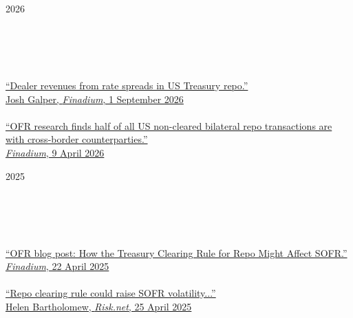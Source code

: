 \documentclass[11pt,letterpaper]{article}
\begin{document}
\noindent
\begin{minipage}[ht]{0.15\textwidth}
2026 \\
\\
\\
\\
\\
\end{minipage}
\begin{minipage}[ht]{0.80\textwidth}
\href{https://finadium.com/dealer-revenues-from-rate-spreads-in-us-treasury-repo/}{``Dealer revenues from rate spreads in US Treasury repo.'' \\
Josh Galper, \textit{Finadium}, 1 September 2026} \\
\\
\href{https://finadium.com/ofr-research-finds-half-of-all-us-non-cleared-bilateral-repo-transactions-are-with-cross-border-counterparties/}{``OFR research finds half of all US non-cleared bilateral repo transactions are with cross-border counterparties.'' \\
\textit{Finadium}, 9 April 2026}
\end{minipage}

\bigskip

\noindent
\begin{minipage}[ht]{0.15\textwidth}
2025 \\
\\
\\
\\
\\
\end{minipage}
\begin{minipage}[ht]{0.80\textwidth}
\href{https://finadium.com/ofr-blog-post-how-the-treasury-clearing-rule-for-repo-might-affect-sofr/}{``OFR blog post: How the Treasury Clearing Rule for Repo Might Affect SOFR.'' \\
\textit{Finadium}, 22 April 2025} \\
\\
\href{https://www.risk.net/markets/7961435/repo-clearing-rule-could-raise-sofr-volatility-ofr-analysts}{``Repo clearing rule could raise SOFR volatility...'' \\
Helen Bartholomew, \textit{Risk.net}, 25 April 2025}
\end{minipage}

\bigskip
\end{document}
